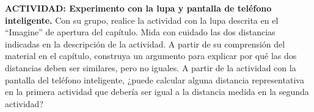 \item \textbf{ACTIVIDAD: Experimento con la lupa y pantalla de teléfono inteligente.}
Con su grupo, realice la actividad con la lupa descrita en el ``Imagine'' de apertura del capítulo. Mida con cuidado las dos distancias indicadas en la descripción de la actividad. A partir de su comprensión del material en el capítulo, construya un argumento para explicar por qué las dos distancias deben ser similares, pero no iguales. A partir de la actividad con la pantalla del teléfono inteligente, ¿puede calcular alguna distancia representativa en la primera actividad que debería ser igual a la distancia medida en la segunda actividad?